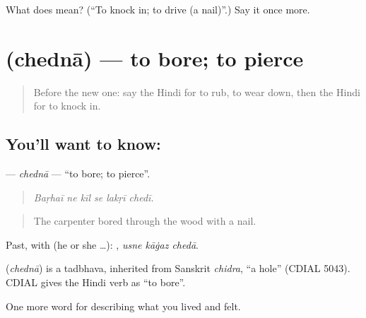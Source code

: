 \begin{tcolorbox}[breakable,colback=teal!4,colframe=teal!35!black,title={Before you move on}]
What does  mean? (\textquotedblleft{}To knock in; to drive (a nail)\textquotedblright{}.) Say it once more.
\end{tcolorbox}
\section[\texorpdfstring{\hi{छेदना} (chednā)}{छेदना (chednā)}]{ (chednā) — to bore; to pierce}

\label{lesson:HI-C510-chedna}



\begin{quote}
Before the new one: say the Hindi for to rub, to wear down, then the Hindi for to knock in.
\end{quote}

\subsection*{You'll want to know: }
\textbf{} — \emph{chednā} — \textquotedblleft{}to bore; to pierce\textquotedblright{}.

\begin{quote}
     
\end{quote}

\begin{quote}
\emph{Baṛhaī ne kīl se lakṛī chedī.}
\end{quote}

\begin{quote}
The carpenter bored through the wood with a nail.
\end{quote}

Past, with  (he or she …):   , \emph{usne kāġaz chedā}.

\begin{cousinweb}
\textbf{} (\emph{chednā}) is a tadbhava, inherited from Sanskrit \emph{chidra}, \textquotedblleft{}a hole\textquotedblright{} (CDIAL 5043). CDIAL gives the Hindi verb as \textquotedblleft{}to bore\textquotedblright{}.
\end{cousinweb}

\begin{grammarlens}[title={What you've built}]
One more word for describing what you lived and felt.
\end{grammarlens}

